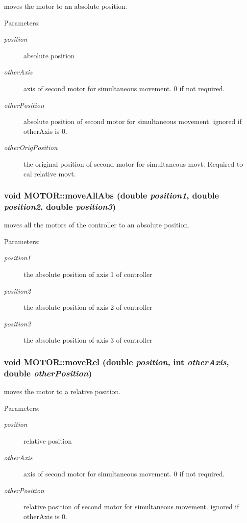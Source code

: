moves the motor to an absolute position. \begin{Desc}
\item[Parameters:]
\begin{description}
\item[{\em position}]absolute position \item[{\em other\-Axis}]axis of second motor for simultaneous movement. 0 if not required. \item[{\em other\-Position}]absolute position of second motor for simultaneous movement. ignored if other\-Axis is 0. \item[{\em other\-Orig\-Position}]the original position of second motor for simultaneous movt. Required to cal relative movt. \end{description}
\end{Desc}
\subsubsection{\setlength{\rightskip}{0pt plus 5cm}void MOTOR::move\-All\-Abs (double {\em position1}, double {\em position2}, double {\em position3})}\label{classMOTOR_86a63b3b4c394a27546c937ddabd8fcd}


moves all the motors of the controller to an absolute position. \begin{Desc}
\item[Parameters:]
\begin{description}
\item[{\em position1}]the absolute position of axis 1 of controller \item[{\em position2}]the absolute position of axis 2 of controller \item[{\em position3}]the absolute position of axis 3 of controller \end{description}
\end{Desc}
\subsubsection{\setlength{\rightskip}{0pt plus 5cm}void MOTOR::move\-Rel (double {\em position}, int {\em other\-Axis}, double {\em other\-Position})}\label{classMOTOR_b32fc1873cf80a122c82297410217068}


moves the motor to a relative position. \begin{Desc}
\item[Parameters:]
\begin{description}
\item[{\em position}]relative position \item[{\em other\-Axis}]axis of second motor for simultaneous movement. 0 if not required. \item[{\em other\-Position}]relative position of second motor for simultaneous movement. ignored if other\-Axis is 0. \end{description}
\end{Desc}

